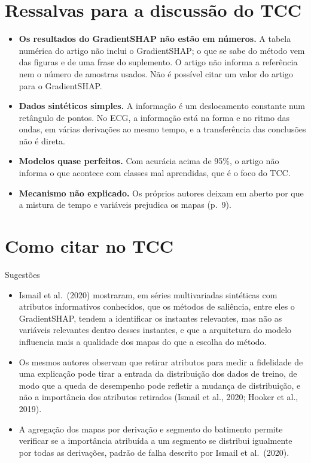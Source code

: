 \documentclass[11pt,a4paper]{article}
\begin{document}
\section{Ressalvas para a discussão do TCC}
\begin{itemize}
\item \textbf{Os resultados do GradientSHAP não estão em números.} A tabela numérica do artigo não inclui o GradientSHAP; o que se sabe do método vem das figuras e de uma frase do suplemento. O artigo não informa a referência nem o número de amostras usados. Não é possível citar um valor do artigo para o GradientSHAP.
\item \textbf{Dados sintéticos simples.} A informação é um deslocamento constante num retângulo de pontos. No ECG, a informação está na forma e no ritmo das ondas, em várias derivações ao mesmo tempo, e a transferência das conclusões não é direta.
\item \textbf{Modelos quase perfeitos.} Com acurácia acima de 95\%, o artigo não informa o que acontece com classes mal aprendidas, que é o foco do TCC.
\item \textbf{Mecanismo não explicado.} Os próprios autores deixam em aberto por que a mistura de tempo e variáveis prejudica os mapas (p.~9).
\end{itemize}

\section{Como citar no TCC}
\begin{infobox}[ok]{Sugestões}
\begin{itemize}
\item Ismail et al.\ (2020) mostraram, em séries multivariadas sintéticas com atributos informativos conhecidos, que os métodos de saliência, entre eles o GradientSHAP, tendem a identificar os instantes relevantes, mas não as variáveis relevantes dentro desses instantes, e que a arquitetura do modelo influencia mais a qualidade dos mapas do que a escolha do método.
\item Os mesmos autores observam que retirar atributos para medir a fidelidade de uma explicação pode tirar a entrada da distribuição dos dados de treino, de modo que a queda de desempenho pode refletir a mudança de distribuição, e não a importância dos atributos retirados (Ismail et al., 2020; Hooker et al., 2019).
\item A agregação dos mapas por derivação e segmento do batimento permite verificar se a importância atribuída a um segmento se distribui igualmente por todas as derivações, padrão de falha descrito por Ismail et al.\ (2020).
\end{itemize}
\end{infobox}
\end{document}
